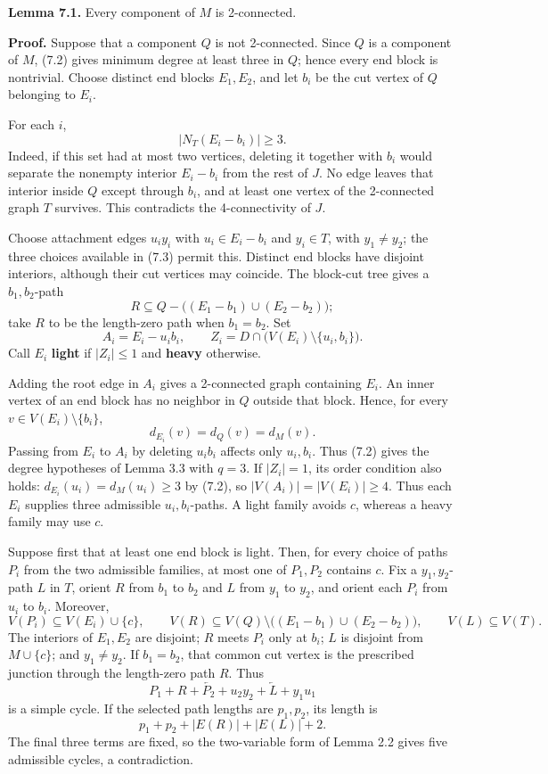 \documentclass[
  11pt]{article}
\begin{document}
\textbf{Lemma 7.1.} Every component of \(M\) is 2-connected.

\textbf{Proof.} Suppose that a component \(Q\) is not 2-connected. Since
\(Q\) is a component of \(M\), (7.2) gives minimum degree at least three
in \(Q\); hence every end block is nontrivial. Choose distinct end
blocks \(E_1,E_2\), and let \(b_i\) be the cut vertex of \(Q\) belonging
to \(E_i\).

For each \(i\), \[
 |N_T(E_i-b_i)|\ge3. \tag{7.3}
\] Indeed, if this set had at most two vertices, deleting it together
with \(b_i\) would separate the nonempty interior \(E_i-b_i\) from the
rest of \(J\). No edge leaves that interior inside \(Q\) except through
\(b_i\), and at least one vertex of the 2-connected graph \(T\)
survives. This contradicts the 4-connectivity of \(J\).

Choose attachment edges \(u_iy_i\) with \(u_i\in E_i-b_i\) and
\(y_i\in T\), with \(y_1\ne y_2\); the three choices available in (7.3)
permit this. Distinct end blocks have disjoint interiors, although their
cut vertices may coincide. The block-cut tree gives a \(b_1,b_2\)-path
\[
 R\subseteq Q-\bigl((E_1-b_1)\cup(E_2-b_2)\bigr);
\] take \(R\) to be the length-zero path when \(b_1=b_2\). Set \[
 A_i=E_i-u_ib_i,
 \qquad
 Z_i=D\cap\bigl(V(E_i)\setminus\{u_i,b_i\}\bigr).
\] Call \(E_i\) \textbf{light} if \(|Z_i|\le1\) and \textbf{heavy}
otherwise.

Adding the root edge in \(A_i\) gives a 2-connected graph containing
\(E_i\). An inner vertex of an end block has no neighbor in \(Q\)
outside that block. Hence, for every \(v\in V(E_i)\setminus\{b_i\}\), \[
 d_{E_i}(v)=d_Q(v)=d_M(v).
\] Passing from \(E_i\) to \(A_i\) by deleting \(u_ib_i\) affects only
\(u_i,b_i\). Thus (7.2) gives the degree hypotheses of Lemma 3.3 with
\(q=3\). If \(|Z_i|=1\), its order condition also holds:
\(d_{E_i}(u_i)=d_M(u_i)\ge3\) by (7.2), so \(|V(A_i)|=|V(E_i)|\ge4\).
Thus each \(E_i\) supplies three admissible \(u_i,b_i\)-paths. A light
family avoids \(c\), whereas a heavy family may use \(c\).


Suppose first that at least one end block is light. Then, for every
choice of paths \(P_i\) from the two admissible families, at most one of
\(P_1,P_2\) contains \(c\). Fix a \(y_1,y_2\)-path \(L\) in \(T\),
orient \(R\) from \(b_1\) to \(b_2\) and \(L\) from \(y_1\) to \(y_2\),
and orient each \(P_i\) from \(u_i\) to \(b_i\). Moreover, \[
 V(P_i)\subseteq V(E_i)\cup\{c\},
 \qquad
 V(R)\subseteq
 V(Q)\setminus\bigl((E_1-b_1)\cup(E_2-b_2)\bigr),
 \qquad
 V(L)\subseteq V(T).
\] The interiors of \(E_1,E_2\) are disjoint; \(R\) meets \(P_i\) only
at \(b_i\); \(L\) is disjoint from \(M\cup\{c\}\); and \(y_1\ne y_2\).
If \(b_1=b_2\), that common cut vertex is the prescribed junction
through the length-zero path \(R\). Thus \[
 P_1+R+\overleftarrow{P_2}+u_2y_2+\overleftarrow L+y_1u_1
\] is a simple cycle. If the selected path lengths are \(p_1,p_2\), its
length is \[
 p_1+p_2+|E(R)|+|E(L)|+2.
\] The final three terms are fixed, so the two-variable form of Lemma
2.2 gives five admissible cycles, a contradiction.
\end{document}
